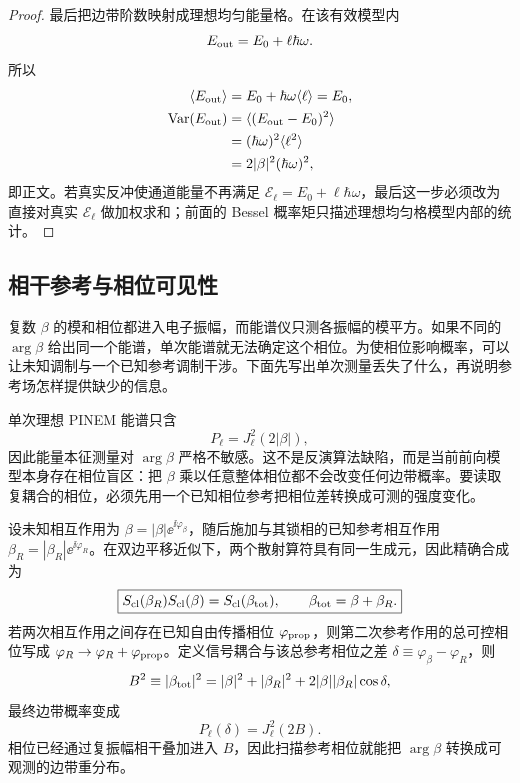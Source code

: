 \begin{proof}
最后把边带阶数映射成理想均匀能量格。在该有效模型内
\begin{equation*}
 E_{\rm out}=E_0+\ell\hbar\omega.
\end{equation*}
所以
\begin{align*}
 \langle E_{\rm out}\rangle
 &=E_0+\hbar\omega\langle\ell\rangle
 =E_0,\\
 \operatorname{Var}(E_{\rm out})
 &=\langle(E_{\rm out}-E_0)^2\rangle\\
 &=(\hbar\omega)^2\langle\ell^2\rangle\\
 &=2|\beta|^2(\hbar\omega)^2,
\end{align*}
即正文。若真实反冲使通道能量不再满足 $\mathcal E_\ell=E_0+\ell\hbar\omega$，最后这一步必须改为直接对真实 $\mathcal E_\ell$ 做加权求和；前面的 Bessel 概率矩只描述理想均匀格模型内部的统计。
\end{proof}




\subsection{相干参考与相位可见性}\label{subsec:pinem-coherent-reference-dp31}

复数 $\beta$ 的模和相位都进入电子振幅，而能谱仪只测各振幅的模平方。如果不同的 $\arg\beta$ 给出同一个能谱，单次能谱就无法确定这个相位。为使相位影响概率，可以让未知调制与一个已知参考调制干涉。下面先写出单次测量丢失了什么，再说明参考场怎样提供缺少的信息。

单次理想 PINEM 能谱只含
\begin{equation*}
 P_\ell=J_\ell^2(2|\beta|),
\end{equation*}
因此能量本征测量对 $\arg\beta$ 严格不敏感。这不是反演算法缺陷，而是当前前向模型本身存在相位盲区：把 $\beta$ 乘以任意整体相位都不会改变任何边带概率。要读取复耦合的相位，必须先用一个已知相位参考把相位差转换成可测的强度变化。

设未知相互作用为 $\beta=|\beta|\ee^{\ii\varphi_\beta}$，随后施加与其锁相的已知参考相互作用 $\beta_R=|\beta_R|\ee^{\ii\varphi_R}$。在双边平移近似下，两个散射算符具有同一生成元，因此精确合成为
\begin{equation}
 \boxed{
 S_{\rm cl}(\beta_R)S_{\rm cl}(\beta)
 =S_{\rm cl}(\beta_{\rm tot}),
 \qquad
 \beta_{\rm tot}=\beta+\beta_R.}
 \label{eq:pinem-reference-composition-dp31}
\end{equation}
若两次相互作用之间存在已知自由传播相位 $\varphi_{\rm prop}$，则第二次参考作用的总可控相位写成 $\varphi_R\to\varphi_R+\varphi_{\rm prop}$。定义信号耦合与该总参考相位之差 $\delta\equiv\varphi_\beta-\varphi_R$，则
\begin{equation*}
 B^2\equiv|\beta_{\rm tot}|^2
 =|\beta|^2+|\beta_R|^2
 +2|\beta||\beta_R|\cos\delta,
\end{equation*}
最终边带概率变成
\begin{equation}
 \boxed{P_\ell(\delta)=J_\ell^2(2B).}
 \label{eq:pinem-reference-sidebands-dp31}
\end{equation}
相位已经通过复振幅相干叠加进入 $B$，因此扫描参考相位就能把 $\arg\beta$ 转换成可观测的边带重分布。


